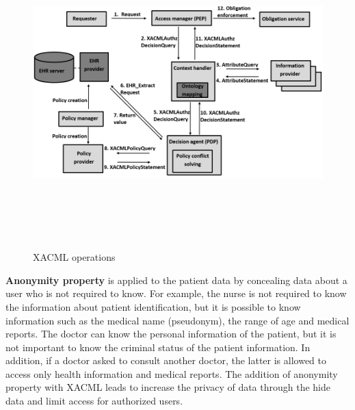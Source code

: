 \documentclass[a4paper,11pt]{article}
\begin{document}
\begin{enumerate}
\begin{figure}[t]
	\centering
		\includegraphics[width=18cm,height=12cm]{pic/xacmloperations.png}
	\caption{XACML operations \cite{pr48}}
	\label{fig:xacmlops}
\end{figure}

\textbf{Anonymity property} is applied to the patient data by concealing data about a user who is not required to know. For example, the nurse is not required to know the information about patient identification, but it is possible to know information such as the medical name (pseudonym), the range of age and medical reports. The doctor can know the personal information of the patient, but it is not important to know the criminal status of the patient information. In addition, if a doctor asked to consult another doctor, the latter is allowed to access only health information and medical reports. The addition of anonymity property with XACML leads to increase the privacy of data through the hide data and limit access for authorized users.
\end{enumerate}
\end{document}
